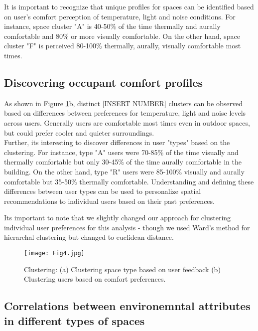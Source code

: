 It is important to recognize that unique profiles for spaces can be identified based on user's comfort perception of temperature, light and noise conditions. For instance, space cluster "A" is 40-50\% of the time thermally and aurally comfortable and 80\% or more visually comfortable. On the other hand, space cluster "F" is perceived 80-100\% thermally, aurally, visually comfortable most times.           


\subsection{Discovering occupant comfort profiles}
 
As shown in Figure \ref{fig:clustering}b, distinct [INSERT NUMBER] clusters can be observed based on differences between preferences for temperature, light and noise levels across users. Generally users are comfortable most times even in outdoor spaces, but could prefer cooler and quieter surroundings.\\

Further, its interesting to discover differences in user "types" based on the clustering. For instance, type "A" users were 70-85\% of the time visually and thermally comfortable but only 30-45\% of the time aurally comfortable in the building. On the other hand, type "R" users were 85-100\% visually and aurally comfortable but 35-50\% thermally comfortable. Understanding and defining these differences between user types can be used to personalize spatial recommendations to individual users based on their past preferences.       

Its important to note that we slightly changed our approach for clustering individual user preferences for this analysis - though we used Ward's method for hierarchal clustering but changed to euclidean distance.\\    


\begin{figure}
\begin{center}
\texttt{[image: Fig4.jpg]}
\caption{Clustering: (a) Clustering space type based on user feedback (b) Clustering users based on comfort preferences.}
\label{fig:clustering}
\end{center}
\end{figure}




\subsection{Correlations between environemntal attributes in different types of spaces}

